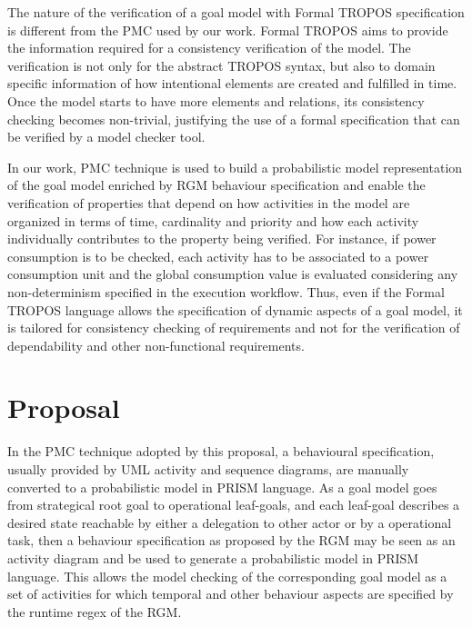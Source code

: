 The nature of the verification of a goal model with Formal TROPOS specification is different from the PMC used by our work. Formal TROPOS aims to provide the information required for a consistency verification of the model. The verification is not only for the abstract TROPOS syntax, but also to domain specific information of how intentional elements are created and fulfilled in time. Once the model starts to have more elements and relations, its consistency checking becomes non-trivial, justifying the use of a formal specification that can be verified by a model checker tool. 

In our work, PMC technique is used to build a probabilistic model representation of the goal model enriched by RGM behaviour specification and enable the verification of properties that depend on how activities in the model are organized in terms of time, cardinality and priority and how each activity individually contributes to the property being verified. For instance, if power consumption is to be checked, each activity has to be associated to a power consumption unit and the global consumption value is evaluated considering any non-determinism specified in the execution workflow. Thus, even if the Formal TROPOS language allows the specification of dynamic aspects of a goal model, it is tailored for consistency checking of requirements and not for the verification of dependability and other non-functional requirements.

\chapter{Proposal}\label{ch_proposal}

In the PMC technique adopted by this proposal, a behavioural specification, usually provided by UML activity and sequence diagrams, are manually converted to a probabilistic model in PRISM language. As a goal model goes from strategical root goal to operational leaf-goals, and each leaf-goal describes a desired state reachable by either a delegation to other actor or by a operational task, then a behaviour specification as proposed by the RGM may be seen as an activity diagram and be used to generate a probabilistic model in PRISM language. This allows the model checking of the corresponding goal model as a set of activities for which temporal and other behaviour aspects are specified by the runtime regex of the RGM.

